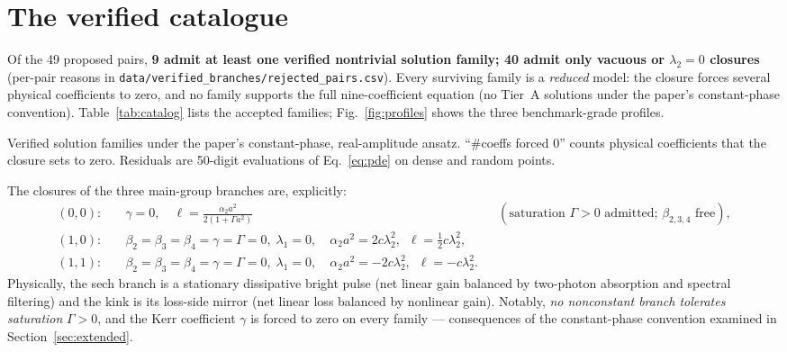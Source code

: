 \documentclass[11pt,a4paper]{article}
\begin{document}
\section{The verified catalogue}
\label{sec:catalog}

Of the 49 proposed pairs, \textbf{9 admit at least one verified nontrivial
solution family; 40 admit only vacuous or $\lambda_2=0$ closures}
(per-pair reasons in \texttt{data/verified\_branches/rejected\_pairs.csv}).
Every surviving family is a \emph{reduced} model: the closure forces several
physical coefficients to zero, and no family supports the full
nine-coefficient equation (no Tier~A solutions under the paper's constant-phase
convention). Table~\ref{tab:catalog} lists the accepted families;
Fig.~\ref{fig:profiles} shows the three benchmark-grade profiles.

\begin{table}[htbp]\centering
\caption{Verified solution families under the paper's constant-phase,
real-amplitude ansatz. ``\#coeffs forced 0'' counts physical coefficients that
the closure sets to zero. Residuals are 50-digit evaluations of
Eq.~\eqref{eq:pde} on dense and random points.}
\label{tab:catalog}
\small

\end{table}

The closures of the three main-group branches are, explicitly:
\begin{align}
(0,0):&\quad \gamma=0,\quad
\ell=\frac{\alpha_2a^2}{2\left(1+\Gamma a^2\right)}
&&(\text{saturation }\Gamma>0\text{ admitted; }\beta_{2,3,4}\text{ free}),\\
(1,0):&\quad \beta_2=\beta_3=\beta_4=\gamma=\Gamma=0,\;\lambda_1=0,\quad
\alpha_2a^2=2c\lambda_2^2,\;\ \ell=\tfrac{1}{2}c\lambda_2^2,\\
(1,1):&\quad \beta_2=\beta_3=\beta_4=\gamma=\Gamma=0,\;\lambda_1=0,\quad
\alpha_2a^2=-2c\lambda_2^2,\;\ \ell=-c\lambda_2^2 .
\end{align}
Physically, the sech branch is a stationary dissipative bright pulse (net
linear gain balanced by two-photon absorption and spectral filtering) and the
kink is its loss-side mirror (net linear loss balanced by nonlinear gain).
Notably, \emph{no nonconstant branch tolerates saturation} $\Gamma>0$, and the
Kerr coefficient $\gamma$ is forced to zero on every family --- consequences of
the constant-phase convention examined in Section~\ref{sec:extended}.
\end{document}
